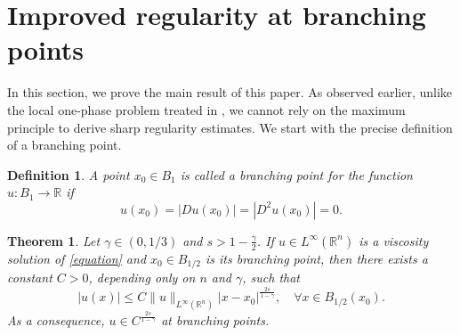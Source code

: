 \documentclass[11pt,reqno]{amsart}
\newtheorem{theorem}{Theorem}
\newtheorem{definition}{Definition}
\numberwithin{equation}{section}
\numberwithin{theorem}{section}
\numberwithin{lemma}{section}
\numberwithin{corollary}{section}
\numberwithin{remark}{section}
\numberwithin{proposition}{section}
\numberwithin{definition}{section}
\newcommand{\R}{\mathbb{R}}
\begin{document}
\medskip

\section{Improved regularity at branching points}\label{s4}
In this section, we prove the main result of this paper. As observed earlier, unlike the local one-phase problem treated in \cite{T16}, we cannot rely on the maximum principle to derive sharp regularity estimates. We start with the precise definition of a branching point.

\begin{definition}\label{branching points}
A point $x_0 \in B_1$ is called a branching point for the function $u:B_1 \to \R$ if 
$$u(x_0)=|Du(x_0)|=|D^2u(x_0)|=0.$$
\end{definition}

\begin{theorem}\label{main result 1}
    Let $\gamma\in(0,1/3)$ and $s>1-\frac{\gamma}{2}$. If $u\in L^\infty(\R^n)$ is a viscosity solution of \eqref{equation} and $x_0\in B_{1/2}$ is its branching point, then there exists a constant $C>0$, depending only on $n$ and $\gamma$, such that
\begin{equation}\label{growth estimate 2025}  
    |u(x)|\le C\|u\|_{L^\infty(\R^n)}|x-x_0|^{\frac{2s}{1-\gamma}}, \quad \forall x \in B_{1/2}(x_0).      
\end{equation} 
As a consequence, $u\in C^{\frac{2s}{1-\gamma}}$ at branching points.
\end{theorem}
\end{document}
